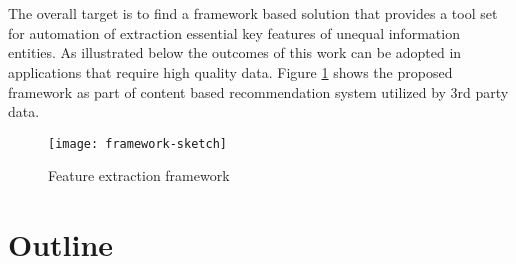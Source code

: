 \\\\
The overall target is to find a framework based solution that provides a tool set for automation of extraction essential key features of unequal information entities. As illustrated below the outcomes of this work can be adopted in applications that require high quality data. Figure \ref{fig:framework-sketch} shows the proposed framework as part of content based recommendation system utilized by 3rd party data.
\\
\begin{figure}[htb]
  \centering
  \texttt{[image: framework-sketch]}\\
  \caption{Feature extraction framework}\label{fig:framework-sketch}
\end{figure}

\section{Outline\label{sec:outline}}

